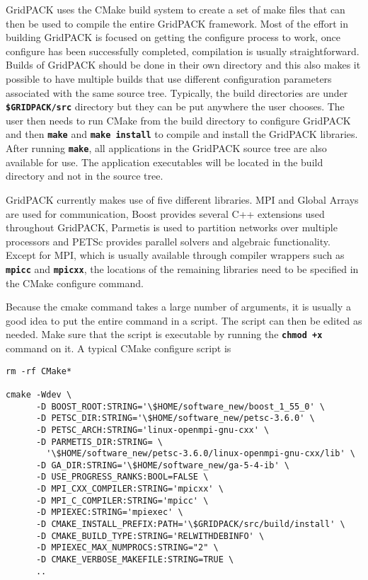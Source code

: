 GridPACK uses the CMake build system to create a set of make files that can then be used to compile the entire GridPACK framework. Most of the effort in building GridPACK is focused on getting the configure process to work, once configure has been successfully completed, compilation is usually straightforward. Builds of GridPACK should be done in their own directory and this also makes it possible to have multiple builds that use different configuration parameters associated with the same source tree. Typically, the build directories are under \texttt{\textbf{\$GRIDPACK/src}} directory but they can be put anywhere the user chooses. The user then needs to run CMake from the build directory to configure GridPACK and then \texttt{\textbf{make}} and \texttt{\textbf{make install}} to compile and install the GridPACK libraries. After running \texttt{\textbf{make}}, all applications in the GridPACK source tree are also available for use. The application executables will be located in the build directory and not in the source tree. 

GridPACK currently makes use of five different libraries. MPI and Global Arrays are used for communication, Boost provides several C++ extensions used throughout GridPACK, Parmetis is used to partition networks over multiple processors and PETSc provides parallel solvers and algebraic functionality. Except for MPI, which is usually available through compiler wrappers such as \texttt{\textbf{mpicc}} and \texttt{\textbf{mpicxx}}, the locations of the remaining libraries need to be specified in the CMake configure command.

Because the cmake command takes a large number of arguments, it is usually a good idea to put the entire command in a script. The script can then be edited as needed. Make sure that the script is executable by running the \texttt{\textbf{chmod +x}} command on it. A typical CMake configure script is

{
\color{red}
\begin{Verbatim}[fontseries=b]
rm -rf CMake*

cmake -Wdev \
      -D BOOST_ROOT:STRING='\$HOME/software_new/boost_1_55_0' \
      -D PETSC_DIR:STRING='\$HOME/software_new/petsc-3.6.0' \
      -D PETSC_ARCH:STRING='linux-openmpi-gnu-cxx' \
      -D PARMETIS_DIR:STRING= \
        '\$HOME/software_new/petsc-3.6.0/linux-openmpi-gnu-cxx/lib' \
      -D GA_DIR:STRING='\$HOME/software_new/ga-5-4-ib' \
      -D USE_PROGRESS_RANKS:BOOL=FALSE \
      -D MPI_CXX_COMPILER:STRING='mpicxx' \
      -D MPI_C_COMPILER:STRING='mpicc' \
      -D MPIEXEC:STRING='mpiexec' \
      -D CMAKE_INSTALL_PREFIX:PATH='\$GRIDPACK/src/build/install' \
      -D CMAKE_BUILD_TYPE:STRING='RELWITHDEBINFO' \
      -D MPIEXEC_MAX_NUMPROCS:STRING="2" \
      -D CMAKE_VERBOSE_MAKEFILE:STRING=TRUE \
      ..
\end{Verbatim}
}

